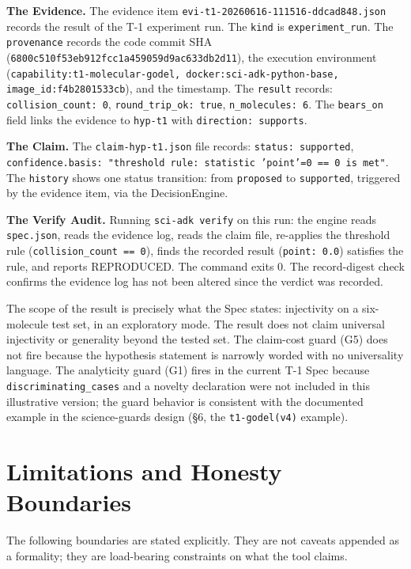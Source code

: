 \documentclass[11pt]{article}
\begin{document}
\textbf{The Evidence.} The evidence item \texttt{evi-t1-20260616-111516-ddcad848.json} records the result of the T-1 experiment run. The \texttt{kind} is \texttt{experiment\_run}. The \texttt{provenance} records the code commit SHA (\texttt{6800c510f53eb912fcc1a459059d9ac633db2d11}), the execution environment (\texttt{capability:t1-molecular-godel, docker:sci-adk-python-base, image\_id:f4b2801533cb}), and the timestamp. The \texttt{result} records: \texttt{collision\_count: 0}, \texttt{round\_trip\_ok: true}, \texttt{n\_molecules: 6}. The \texttt{bears\_on} field links the evidence to \texttt{hyp-t1} with \texttt{direction: supports}.

\textbf{The Claim.} The \texttt{claim-hyp-t1.json} file records: \texttt{status: supported}, \texttt{confidence.basis: "threshold rule: statistic 'point'=0 == 0 is met"}. The \texttt{history} shows one status transition: from \texttt{proposed} to \texttt{supported}, triggered by the evidence item, via the DecisionEngine.

\textbf{The Verify Audit.} Running \texttt{sci-adk verify} on this run: the engine reads \texttt{spec.json}, reads the evidence log, reads the claim file, re-applies the threshold rule (\texttt{collision\_count == 0}), finds the recorded result (\texttt{point: 0.0}) satisfies the rule, and reports REPRODUCED. The command exits 0. The record-digest check confirms the evidence log has not been altered since the verdict was recorded.

The scope of the result is precisely what the Spec states: injectivity on a six-molecule test set, in an exploratory mode. The result does not claim universal injectivity or generality beyond the tested set. The claim-cost guard (G5) does not fire because the hypothesis statement is narrowly worded with no universality language. The analyticity guard (G1) fires in the current T-1 Spec because \texttt{discriminating\_cases} and a novelty declaration were not included in this illustrative version; the guard behavior is consistent with the documented example in the science-guards design (\S6, the \texttt{t1-godel(v4)} example).

\section{Limitations and Honesty Boundaries}

The following boundaries are stated explicitly. They are not caveats appended as a formality; they are load-bearing constraints on what the tool claims.
\end{document}
